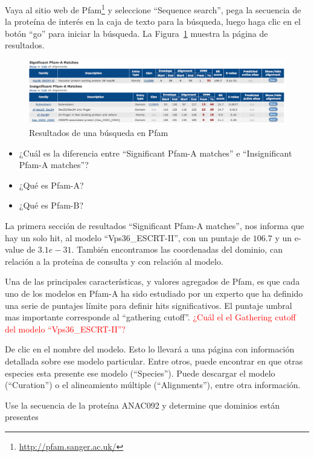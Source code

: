 \documentclass[letter,11pt]{book}
\begin{document}
Vaya al sitio web de Pfam\footnote{\url{http://pfam.sanger.ac.uk/}} y seleccione ``Sequence search'', pega la secuencia de la proteína de interés en la caja de texto para la búsqueda, luego haga clic en el botón ``go'' para iniciar la búsqueda. La Figura~\ref{PfamResults} muestra la página de resultados.

\begin{figure}[h!]
\centering
 \includegraphics[width=14cm]{Figs/PfamResults.png}
 \caption{\label{PfamResults}Resultados de una búsqueda en Pfam}
\end{figure}

{\color{red}
\begin{itemize}
\item ¿Cuál es la diferencia entre ``Significant Pfam-A matches'' e ``Insignificant Pfam-A matches''?
\item ¿Qué es Pfam-A? 
\item ¿Qué es Pfam-B?
\end{itemize}
}

La primera sección de resultados ``Significant Pfam-A matches'', nos informa que hay un solo hit, al modelo ``Vps36\_ESCRT-II'', con un puntaje de $106.7$ y un e-value de $3.1e-31$. También encontramos las coordenadas del dominio, can relación a la proteína de consulta y con relación al modelo.

Una de las principales características, y valores agregados de Pfam, es que cada uno de los modelos en Pfam-A ha sido estudiado por un experto que ha definido una serie de puntajes límite para definir hits significativos. El puntaje umbral mas importante corresponde al ``gathering cutoff''. \textcolor{red}{¿Cuál el el Gathering cutoff del modelo ``Vps36\_ESCRT-II''?}

De clic en el nombre del modelo. Esto lo llevará a una página con información detallada sobre ese modelo particular. Entre otros, puede encontrar en que otras especies esta presente ese modelo (``Species''). Puede descargar el modelo (``Curation'') o el alineamiento múltiple (``Alignments''), entre otra información.

{\color{red}
Use la secuencia de la proteína ANAC092 y determine que dominios están presentes}
\end{document}
